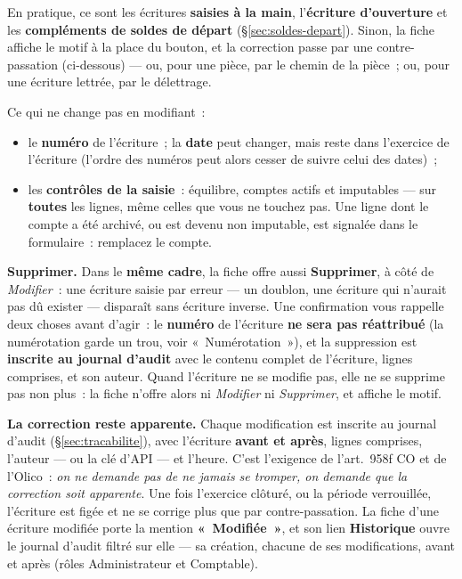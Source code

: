 \documentclass[a4paper,11pt,oneside]{article}
\begin{document}
En pratique, ce sont les écritures \textbf{saisies à la main}, l'\textbf{écriture
d'ouverture} et les \textbf{compléments de soldes de départ}
(\S\ref{sec:soldes-depart}). Sinon, la fiche affiche le motif à la place du bouton, et la
correction passe par une contre-passation (ci-dessous) --- ou, pour une pièce, par le chemin
de la pièce~; ou, pour une écriture lettrée, par le délettrage.

Ce qui ne change pas en modifiant~:

\begin{itemize}
    \item le \textbf{numéro} de l'écriture~; la \textbf{date} peut changer, mais reste dans
          l'exercice de l'écriture (l'ordre des numéros peut alors cesser de suivre celui
          des dates)~;
    \item les \textbf{contrôles de la saisie}~: équilibre, comptes actifs et imputables ---
          sur \textbf{toutes} les lignes, même celles que vous ne touchez pas. Une ligne
          dont le compte a été archivé, ou est devenu non imputable, est signalée dans le
          formulaire~: remplacez le compte.
\end{itemize}

\textbf{Supprimer.} Dans le \textbf{même cadre}, la fiche offre aussi \textbf{Supprimer}, à
côté de \emph{Modifier}~: une écriture saisie par erreur --- un doublon, une écriture qui
n'aurait pas dû exister --- disparaît sans écriture inverse. Une confirmation vous rappelle
deux choses avant d'agir~: le \textbf{numéro} de l'écriture \textbf{ne sera pas réattribué}
(la numérotation garde un trou, voir «~Numérotation~»), et la suppression est \textbf{inscrite au
journal d'audit} avec le contenu complet de l'écriture, lignes comprises, et son auteur. Quand
l'écriture ne se modifie pas, elle ne se supprime pas non plus~: la fiche n'offre alors ni
\emph{Modifier} ni \emph{Supprimer}, et affiche le motif.

\textbf{La correction reste apparente.} Chaque modification est inscrite au journal
d'audit (\S\ref{sec:tracabilite}), avec l'écriture \textbf{avant et après}, lignes
comprises, l'auteur --- ou la clé d'API --- et l'heure. C'est l'exigence de l'art.~958f CO
et de l'Olico~: \emph{on ne demande pas de ne jamais se tromper, on demande que la
correction soit apparente}. Une fois l'exercice clôturé, ou la période verrouillée,
l'écriture est figée et ne se corrige plus que par contre-passation. La fiche d'une écriture
modifiée porte la mention \textbf{«~Modifiée~»}, et son lien \textbf{Historique} ouvre le
journal d'audit filtré sur elle --- sa création, chacune de ses modifications, avant et après
(rôles Administrateur et Comptable).
\end{document}
